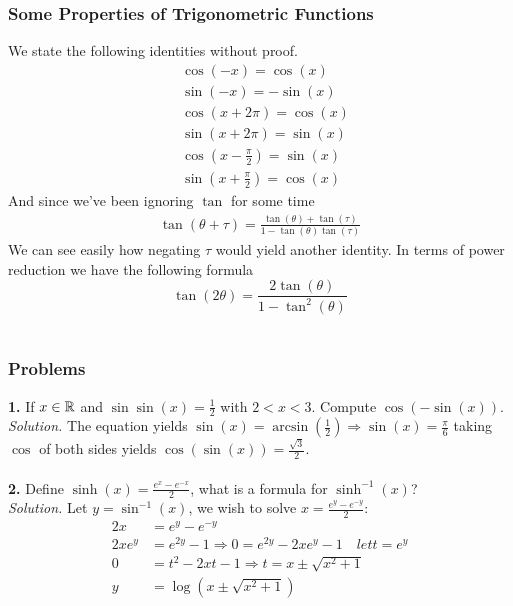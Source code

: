 \subsubsection{Some Properties of Trigonometric Functions}
We state the following identities without proof.
\begin{align*}
	&\cos(-x) = \cos(x)\\
	&\sin(-x) = -\sin(x)\\
	&\cos(x + 2\pi) = \cos(x)\\
	&\sin(x + 2\pi) = \sin(x)\\
	&\cos\left(x - \frac{\pi}{2}\right) = \sin(x)\\
	&\sin\left( x + \frac{\pi}{2}\right) = \cos(x)
\end{align*}
And since we've been ignoring $\tan$ for some time
\begin{align*}
	\tan(\theta + \tau) = \frac{\tan(\theta)+\tan(\tau)}{1-\tan(\theta)\tan(\tau)}
\end{align*}
We can see easily how negating $\tau$ would yield another identity. In terms of power reduction we have the following formula 
$$\tan(2\theta) = \frac{2\tan(\theta)}{1-\tan^{2}(\theta)}$$\\


\subsubsection{Problems}
\textbf{1.} If $x \in \mathbb{R}$ and $\sin\sin(x) = \frac{1}{2}$ with $2 < x < 3$. Compute $\cos(-\sin(x))$.\\

\textit{Solution.} The equation yields $\sin(x) = \arcsin\left(\frac{1}{2}\right) \Rightarrow \sin(x) = \frac{\pi}{6}$ taking $\cos$ of both sides 
yields $\cos(\sin(x)) = \frac{\sqrt{3}}{2}$.\\\\

\textbf{2.} Define $\sinh(x) = \frac{e^{x}-e^{-x}}{2}$, what is a formula for $\sinh^{-1}(x)$?\\

\textit{Solution.} Let $y = \sin^{-1}(x)$, we wish to solve $x = \frac{e^{y}-e^{-y}}{2}$:
\begin{align*}
	2x &= e^{y}-e^{-y}\\
	2xe^{y} &= e^{2y} - 1 \Rightarrow 0 = e^{2y} - 2xe^{y} - 1 \quad let t = e^{y}\\
	0 &= t^2 - 2xt - 1 \Rightarrow t = x \pm \sqrt{x^2 + 1}\\
	y &= \log(x \pm \sqrt{x^2 + 1})
\end{align*}

